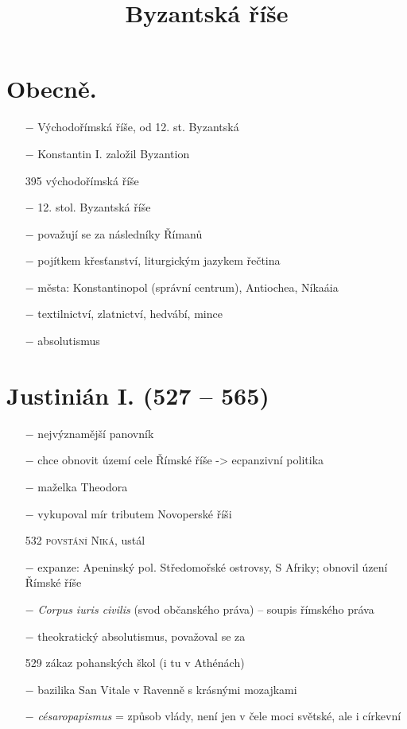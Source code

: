 \documentclass{article}
\title{\vspace{-2cm}Byzantská říše\vspace{-1.7cm}}
\date{}
\author{}
\begin{document}
\maketitle

\section*{Obecně.}
\begin{itemize}
    \vspace{-0.5em}
    \setlength\itemsep{0.15em}
    \item[$-$] Východořímská říše, od 12. st. Byzantská
    \item[$-$] Konstantin I. založil Byzantion
    \item[395] východořímská říše
    \item[$-$] 12. stol. Byzantská říše
    \item[$-$] považují se za následníky Římanů
    \item[$-$] pojítkem křesťanství, liturgickým jazykem řečtina
    \item[$-$] města: Konstantinopol (správní centrum), Antiochea, Níkaáia
    \item[$-$] textilnictví, zlatnictví, hedvábí, mince
    \item[$-$] absolutismus
\end{itemize}

\section*{Justinián I. (527 -- 565)}
\begin{itemize}
    \vspace{-0.5em}
    \setlength\itemsep{0.15em}
    \item[$-$] nejvýznamější panovník
    \item[$-$] chce obnovit území cele Římské říše -> ecpanzivní politika
    \item[$-$] maželka Theodora
    \item[$-$] vykupoval mír tributem Novoperské říši
    \item[532] \textsc{povstání Niká}, ustál
    \item[$-$] expanze: Apeninský pol. Středomořské ostrovsy, S Afriky; obnovil úzení Římské říše
    \item[$-$] \textit{Corpus iuris civilis} (svod občanského práva) -- soupis římského práva
    \item[$-$] theokratický absolutismus, považoval se za 
    \item[529] zákaz pohanských škol (i tu v Athénách)
    \item[$-$] bazilika San Vitale v Ravenně s krásnými mozajkami
    \item[$-$] \textit{césaropapismus} = způsob vlády, není jen v čele moci světské, ale i církevní
\end{itemize}
\end{document}
